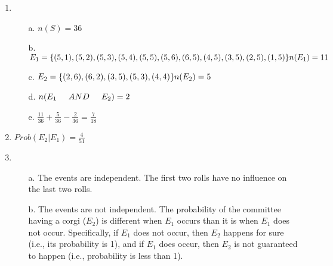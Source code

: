 {\begin{enumerate}
\begin{itemize}
                \item[b.]   $E_{1}$ is the outcomes where you get a diamond,
                            and $E_{2}$ is the outcomes where you get a black Jack, King, or Queen.
                            These sets are disjoint, so...
                            $$Prob(E_{1} or E_{2}) = Prob(E_{1}) + Prob(E_{2}) = \frac{1}{4} + \frac{6}{52} = \frac{19}{52}$$

                \item[c.]   $E_{1}$ is the outcomes where the card has an even numbered value,
                            and $E_{2}$ is the set of outcomes with a red Jack, King, or Queen.
                            These sets are disjoint, so...
                            $$Prob(E_{1} or E_{2}) = Prob(E_{1} + Prob(E_{2}) = \frac{5}{13} + \frac{6}{52} = \frac{1}{2}$$
            \end{itemize}

        \item
            \begin{itemize}
                \item[a.]   $n(S) = 36$
                \item[b.]   $E_1 = \{ (5, 1), (5, 2), (5, 3), (5, 4), (5, 5), (5, 6),
                            (6, 5), (4, 5), (3, 5), (2, 5), (1, 5) \}
                            \\ n(E_1) = 11$
                \item[c.]    $E_2 = \{ (2, 6), (6, 2), (3, 5), (5, 3), (4, 4) \} \\     n(E_2) = 5$

                \item[d.]   $n(E_1 \tab[0.5cm]AND\tab[0.5cm] E_2) = 2$

                \item[e.]   $\frac{11}{36} + \frac{5}{36} - \frac{2}{36} = \frac{7}{18}$
            \end{itemize}

        \item   $Prob(E_{2}|E_{1}) = \frac{4}{51}$

        \item
            \begin{itemize}
                \item[a.]   The events are independent. The first two rolls
                            have no influence on the last two rolls.
                            
                \item[b.]   The events are not independent. The probability
                            of the committee having a corgi ($E_{2}$) is different
                            when $E_{1}$ occurs than it is when $E_{1}$ does not occur.
                            Specifically, if $E_{1}$ does not occur, then $E_{2}$ happens
                            for sure (i.e., its probability is 1), and if $E_{1}$ does occur,
                            then $E_{2}$ is not guaranteed to happen (i.e., probability is
                            less than 1).
            \end{itemize}


\end{enumerate}}
